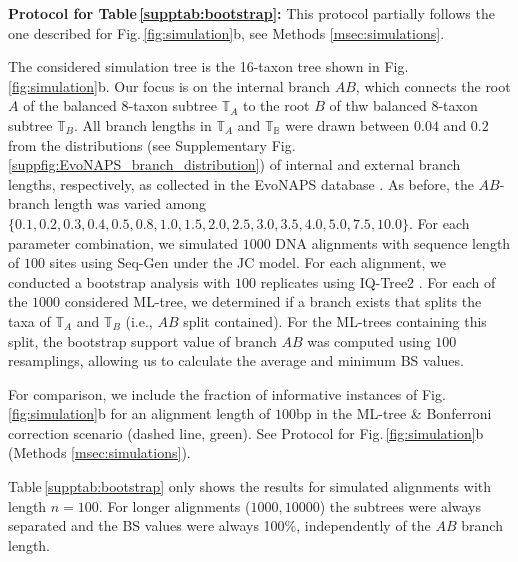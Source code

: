 \begin{appendices}
\begin{table}[hb]
{    }
    \label{supptab:bootstrap}
    \end{table}

\noindent\textbf{Protocol for Table\,\ref{supptab:bootstrap}:} This protocol partially follows the one described for Fig.\,\ref{fig:simulation}b, see Methods \ref{msec:simulations}.

The considered simulation tree is the 16-taxon tree shown in Fig.\,\ref{fig:simulation}b. Our focus is on the internal branch $AB$, which connects the root $A$ of the balanced $8$-taxon subtree $\mathbb{T}_A$ to the root $B$ of thw balanced $8$-taxon subtree $\mathbb{T}_B$. All branch lengths in $\mathbb{T}_A$ and $\mathbb{T_B}$ were drawn between $0.04$ and $0.2$ from the distributions (see Supplementary Fig.\,\ref{suppfig:EvoNAPS_branch_distribution}) of internal and external branch lengths, respectively, as collected in the EvoNAPS database  
. As before, the $AB$-branch length was varied among $\{0.1, 0.2, 0.3, 0.4, 0.5, 0.8, 1.0, 1.5, 2.0, 2.5, 3.0, 3.5, 4.0, 5.0, 7.5, 10.0\}$. For each parameter combination, we simulated  $1000$ DNA alignments with sequence length of $100$ sites using Seq-Gen  under the JC model. For each alignment, we conducted a bootstrap analysis with $100$ replicates using IQ-Tree2 . For each of the $1000$ considered ML-tree, we determined if a branch exists that splits the taxa of $\mathbb{T}_A$ and $\mathbb{T}_B$ (i.e., $AB$ split contained). For the ML-trees containing this split, the bootstrap support value of branch $AB$ was computed using $100$ resamplings, allowing us to calculate the average and minimum BS values.


For comparison, we include the fraction of informative instances of Fig.\,\ref{fig:simulation}b for an alignment length of $100$bp in the ML-tree \& Bonferroni correction scenario (dashed line, {\color{MLtreeBonferroni} green}). See  Protocol for Fig.\,\ref{fig:simulation}b (Methods \ref{msec:simulations}).

\medskip
Table\,\ref{supptab:bootstrap} only shows the results for simulated alignments with length $n=100$. For longer alignments ($1000, 10000$) the subtrees were always separated and the BS values were always 100\%, independently of the $AB$ branch length.

\bigskip

    

\end{appendices}
